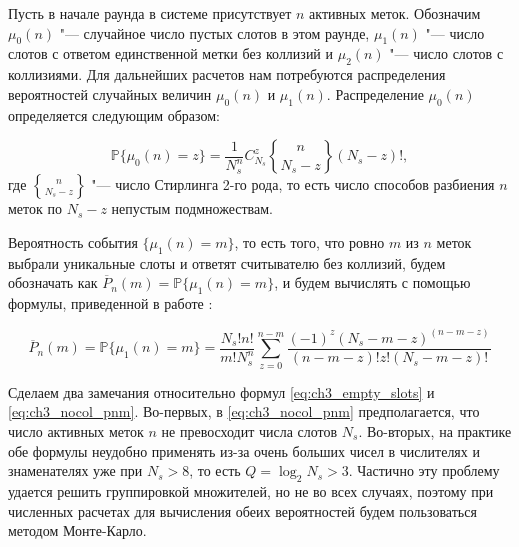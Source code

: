 Пусть в начале раунда в системе присутствует $n$ активных меток. Обозначим $\mu_0(n)$ "--- случайное число пустых слотов в этом раунде, $\mu_1(n)$ "--- число слотов с ответом единственной метки без коллизий и $\mu_2(n)$ "--- число слотов с коллизиями. Для дальнейших расчетов нам потребуются распределения вероятностей случайных величин $\mu_0(n)$ и $\mu_1(n)$. Распределение $\mu_0(n)$ определяется следующим образом:

\begin{equation}\label{eq:ch3_empty_slots}
	\mathbb{P}\{\mu_0(n) = z\} = \frac{1}{N_s^n} C_{N_s}^z {n\brace N_s-z} (N_s - z)!,
\end{equation}
где ${ n\brace N_s-z }$ "--- число Стирлинга 2-го рода, то есть число способов разбиения $n$ меток по $N_s - z$ непустым подмножествам.

Вероятность события $\{ \mu_1(n) = m \}$, то есть того, что ровно $m$ из $n$ меток выбрали уникальные слоты и ответят считывателю без коллизий, будем обозначать как $\overline{P}_n(m) = \mathbb{P}\{ \mu_1(n) = m \}$, и будем вычислять с помощью формулы, приведенной в работе \cite{Vales-Alonso2011}:

\begin{equation}\label{eq:ch3_nocol_pnm}
	\overline{P}_n(m) = \mathbb{P}\{ \mu_1(n) = m \} = \frac{N_s! n!}{m! N_s^n} \sum\limits_{z=0}^{n-m}
		\frac{(-1)^z (N_s - m - z)^{(n - m - z)}}{(n - m - z)! z! (N_s - m - z)!}
\end{equation}

Сделаем два замечания относительно формул \eqref{eq:ch3_empty_slots} и \eqref{eq:ch3_nocol_pnm}. Во-первых, в \eqref{eq:ch3_nocol_pnm} предполагается, что число активных меток $n$ не превосходит числа слотов $N_s$. Во-вторых, на практике обе формулы неудобно применять из-за очень больших чисел в числителях и знаменателях уже при $N_s > 8$, то есть $Q = \log_2 N_s > 3$. Частично эту проблему удается решить группировкой множителей, но не во всех случаях, поэтому при численных расчетах для вычисления обеих вероятностей будем пользоваться методом Монте-Карло.


